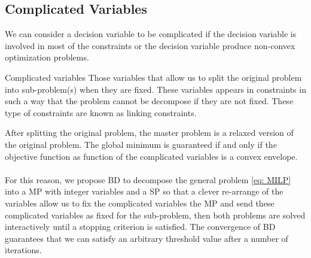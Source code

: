 \subsection{Complicated Variables}
We can consider a decision variable to be complicated if the decision variable is involved in most of the constraints or the decision variable produce non-convex optimization problems. 
\begin{definition}{Complicated variables}{}
Those variables that allow us to split the original problem into sub-problem(s) when they are fixed. These variables appears in constraints in such a way that the problem cannot be decompose if they are not fixed. These type of constraints are known as linking constraints. 
\end{definition}
After splitting the original problem, the master problem is a relaxed version of the original problem. The global minimum is guaranteed if and only if the objective function as function of the complicated variables is a convex envelope.\\\\
For this reason, we propose BD to decompose the general problem \eqref{eq: MILP} into a MP with integer variables and a SP so that a clever re-arrange of the variables allow us to fix the complicated variables the MP and send these complicated variables as fixed for the sub-problem, then both problems are solved interactively until a stopping criterion is satisfied. The convergence of BD\,\cite{Sahinidis1991BDConvergence} guarantees that we can satisfy an arbitrary threshold value after a number of iterations. 
